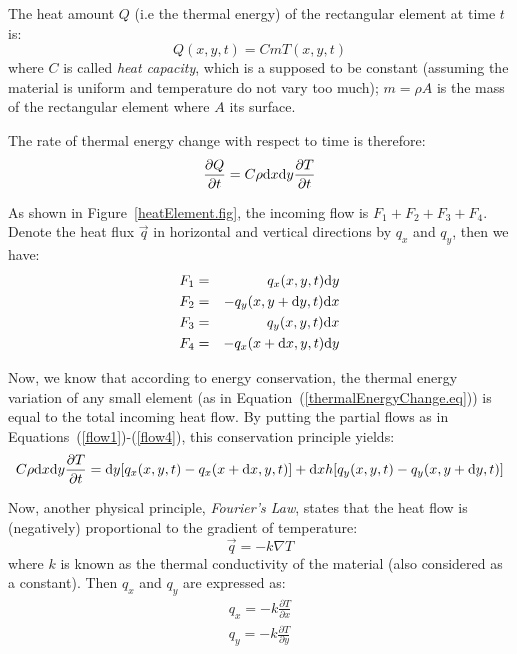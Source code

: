 The heat amount $Q$ (i.e the thermal energy) of the rectangular element at time $t$ is: 
\begin{equation}
Q(x,y,t)=C m T(x,y,t)
\end{equation}
where $C$ is called \emph{heat capacity}, which is a supposed to be constant (assuming the material is uniform and temperature do not vary too much); $m = \rho A$ is the mass of the rectangular element where $A$ its surface.

The rate of thermal energy change with respect to time is therefore:
\begin{equation}\label{thermalEnergyChange.eq}
\frac{\partial Q}{\partial t} = C\rho \mathrm d x \mathrm d y\frac{\partial T}{\partial t}
\end{equation}

As shown in Figure~\ref{heatElement.fig}, the incoming flow is $F_1 + F_2 + F_3 + F_4$. Denote the heat flux $\vec q$ in horizontal and vertical directions by $q_x$ and $q_y$, then we have:
\begin{eqnarray} 
F_1 &=& q_x(x,y,t)\mathrm d y\label{flow1}\\
F_2 &=& -q_y(x,y+\mathrm d y,t)\mathrm d x\label{flow2}\\
F_3 &=& q_y(x,y,t)\mathrm d x\label{flow3}\\
F_4 &=& -q_x(x+\mathrm d x,y,t)\mathrm d y\label{flow4}
\end{eqnarray}

Now, we know that according to energy conservation, the thermal energy variation of any small element (as in Equation~(\ref{thermalEnergyChange.eq})) is equal to the total incoming heat flow.  By putting the partial flows as in Equations~(\ref{flow1})-(\ref{flow4}), this conservation principle yields:
\begin{equation}\label{thermalEnergyChange.eq2}
C\rho \mathrm d x \mathrm d y\frac{\partial T}{\partial t} = \mathrm d y [q_x(x,y,t)-q_x(x+\mathrm d x,y,t)]+\mathrm d xh[q_y(x,y,t)-q_y(x,y+\mathrm d y,t)]
\end{equation}

Now, another physical principle, \emph{Fourier's Law}, states that the heat flow is (negatively) proportional to the gradient of temperature:
\begin{equation}\label{FourierLaw.eq}
\vec q = -k\nabla T
\end{equation}
where $k$ is known as the thermal conductivity of the material (also considered as a constant). Then $q_x$ and $q_y$ are expressed as:
\begin{equation}
\begin{split}
q_x=-k\frac{\partial T}{\partial x}\\
q_y=-k\frac{\partial T}{\partial y}
\end{split}
\end{equation}

